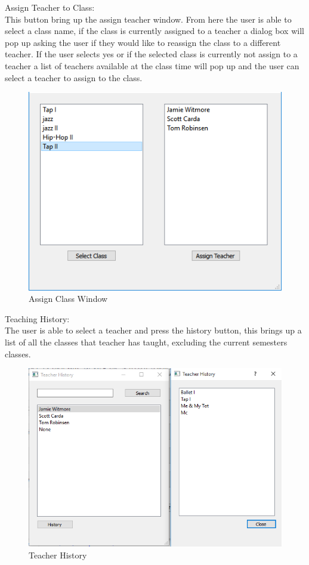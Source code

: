 Assign Teacher to Class:\\
This button bring up the assign teacher window. From here the user is able to select a class name, if the class is currently assigned to a teacher a dialog box will pop up asking the user if they would like to reassign the class to a different teacher. If the user selects yes or if the selected class is currently not assign to a teacher a list of teachers available at the class time will pop up and the user can select a teacher to assign to the class.\\

\begin{figure}
  \includegraphics[width=\linewidth]{pics/userGuide/assignClass.png}
  \caption{Assign Class Window}
  \label{fig:User doc: Assign Class}
\end{figure} 

Teaching History:\\
The user is able to select a teacher and press the history button, this brings up a list of all the classes that teacher has taught, excluding the current semesters classes.\\

\begin{figure}
  \includegraphics[width=\linewidth]{pics/userGuide/history.png}
  \caption{Teacher History}
  \label{fig:User doc: Teacher History}
\end{figure} 

